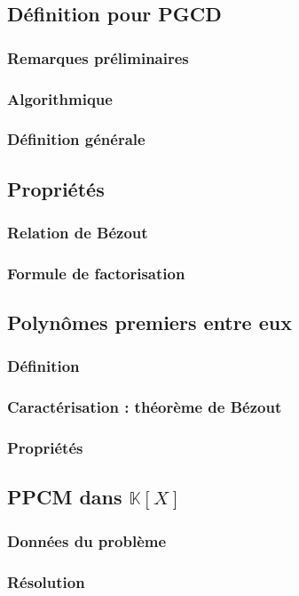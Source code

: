 \documentclass[12pt,a4paper,french]{book}
\begin{document}
		\subsection{Définition pour PGCD}
			\subsubsection{Remarques préliminaires}
			\subsubsection{Algorithmique}
			\subsubsection{Définition générale}
		\subsection{Propriétés}
			\subsubsection{Relation de Bézout}
			\subsubsection{Formule de factorisation}
		\subsection{Polynômes premiers entre eux}
			\subsubsection{Définition}
			\subsubsection{Caractérisation : théorème de Bézout}
			\subsubsection{Propriétés}
		\subsection{PPCM dans $\mathbb{K}[X]$}
			\subsubsection{Données du problème}
			\subsubsection{Résolution}
\end{document}
